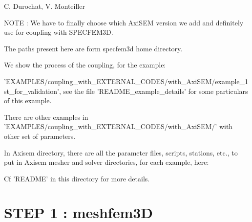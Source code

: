 \documentclass[11pt]{article}
\date{}
\begin{document}
{\huge { }}

\bigskip
\bigskip
\bigskip

 C. Durochat, V. Monteiller

\bigskip
\bigskip

\noindent NOTE : We have to finally choose which AxiSEM version we add and definitely use for coupling with SPECFEM3D.

\medskip

\noindent The paths present here are form specfem3d home directory.

\medskip


\medskip

\noindent We show the process of the coupling, for the example:

\noindent 'EXAMPLES/coupling\_with\_EXTERNAL\_CODES/with\_AxiSEM/example\_1st\_for\_validation', see the file 'README\_example\_details' for some particulars of this example.

\medskip

\noindent There are other examples in 'EXAMPLES/coupling\_with\_EXTERNAL\_CODES/with\_AxiSEM/' with other set of parameters.

\medskip

\noindent In Axisem directory, there are all the parameter files, scripts, stations, etc., to put in Axisem mesher and solver directories, for each example, here:


\noindent Cf 'README' in this directory for more details.

\bigskip

\section{STEP 1 : meshfem3D}
\end{document}
